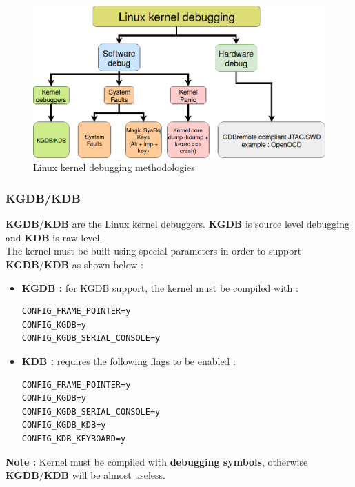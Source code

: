 \begin{figure}[H]
		\centering
        \includegraphics[scale=0.35]{img/solution/kernel-debugging-ways.png}
        \caption{Linux kernel debugging methodologies}
        \label{Linux kernel debugging methodologies}
    \end{figure}


\subsubsection{KGDB/KDB}
\textbf{KGDB}/\textbf{KDB} are the Linux kernel debuggers. \textbf{KGDB} is source level debugging and \textbf{KDB} is raw level.\\

The kernel must be built using special parameters in order to support \textbf{KGDB}/\textbf{KDB} as shown below :
\begin{itemize}
	\item \textbf{KGDB : } for KGDB support, the kernel must be compiled with : 
\begin{lstlisting}[style=BashInputStyle]
CONFIG_FRAME_POINTER=y
CONFIG_KGDB=y
CONFIG_KGDB_SERIAL_CONSOLE=y
\end{lstlisting}


	\item \textbf{KDB : } requires the following flags to be enabled :
\begin{lstlisting}[style=BashInputStyle]	
CONFIG_FRAME_POINTER=y
CONFIG_KGDB=y
CONFIG_KGDB_SERIAL_CONSOLE=y
CONFIG_KGDB_KDB=y
CONFIG_KDB_KEYBOARD=y
\end{lstlisting}	

\end{itemize}

\textbf{\color{orange}Note : } Kernel must be compiled with \textbf{\color{red}debugging symbols}, otherwise \textbf{KGDB}/\textbf{KDB} will be almost useless.



